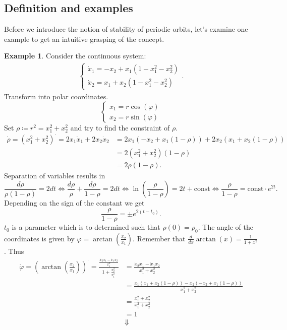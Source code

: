 \documentclass[hidelinks,a4paper, 11pt]{article}
\theoremstyle{plain}
\theoremstyle{break}
\theoremstyle{plain}
\theoremstyle{definition}
\newtheorem*{example}{Example}
\begin{document}
{\subsection{Definition and examples}
Before we introduce the notion of stability of periodic orbits, let's examine one example to get an intuitive grasping of the concept.
\begin{example}
	Consider the continuous system:
	\begin{align*}
		\begin{cases}
			\dot x_1 = -x_2 +x_1(1-x_1^2-x_2^2) \\
			\dot x_2 = x_1 + x_2(1-x_1^2-x_2^2)
		\end{cases}.
	\end{align*}
	Transform into polar coordinates.
	\[
		\begin{cases}
			x_1 = r\cos(\varphi) \\
			x_2 = r \sin(\varphi)
		\end{cases}
	\]
	Set $\rho \coloneqq r^2 = x_1^2 +x_2^2$ and try to find the constraint of $\rho$.
	\begin{align*}
		\dot \rho = (x_1^2 + x_2^2)^{\boldsymbol{\cdot}} = 2x_1\dot x_1 + 2x_2\dot x_2 &= 2x_1(-x_2 + x_1(1-\rho)) + 2x_2(x_1 + x_2(1- \rho)) \\
		&=2(x_1^2 + x_2^2)(1- \rho) \\
		&= 2\rho(1-\rho).
	\end{align*}
	Separation of variables results in
	\[
		\frac{d\rho}{\rho(1-\rho)} = 2 dt \iff \frac{d\rho}{\rho} + \frac{d\rho}{1-\rho} = 2dt \iff \ln(\frac{\rho}{1-\rho}) = 2t + \mathrm{const} \iff \frac{\rho}{1-\rho} = \mathrm{const} \cdot e^{2t}.
	\]
	Depending on the sign of the constant we get
	\[
		\frac{\rho}{1-\rho} = \pm e^{2(t - t_0)}.
	\]
	$t_0$ is a parameter which is to determined such that $\rho(0) = \rho_0$. The angle of the coordinates is given by $\varphi = \arctan(\frac{x_2}{x_1})$. Remember that $\frac{d}{dx}\arctan(x) = \frac{1}{1+x^2}$. Thus
	\begin{align*}
		\dot \varphi = (\arctan(\frac{x_2}{x_1}))^{\boldsymbol\cdot} = \frac{\frac{\dot x_2 x_1 - \dot x_1 x_2}{x_1^2}}{1 + \frac{x_2^2}{x_1^2}} &= \frac{\dot x_2 x_1 - \dot x_1 x_2}{x_1^2+x_2^2} \\
		&= \frac{x_1(x_1 + x_2(1- \rho)) - x_2(-x_2 +  x_1(1- \rho))}{x_1^2+x_2^2} \\
		&= \frac{x_1^2 + x_2^2}{x_1^2 + x_2^2} \\
		&= 1 \\
		&\Downarrow \\

\end{align*}
\end{example}}
\end{document}
